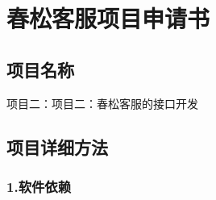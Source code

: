 \documentclass{article}
\begin{document}
\hypertarget{ux6625ux677eux5ba2ux670dux9879ux76eeux7533ux8bf7ux4e66}{%
\section{春松客服项目申请书}\label{ux6625ux677eux5ba2ux670dux9879ux76eeux7533ux8bf7ux4e66}}

\hypertarget{ux9879ux76eeux540dux79f0}{%
\subsection{项目名称}\label{ux9879ux76eeux540dux79f0}}

项目二：项目二：春松客服的接口开发

\hypertarget{ux9879ux76eeux8be6ux7ec6ux65b9ux6cd5}{%
\subsection{项目详细方法}\label{ux9879ux76eeux8be6ux7ec6ux65b9ux6cd5}}

\hypertarget{ux8f6fux4ef6ux4f9dux8d56}{%
\subsubsection{1.软件依赖}\label{ux8f6fux4ef6ux4f9dux8d56}}
\end{document}
